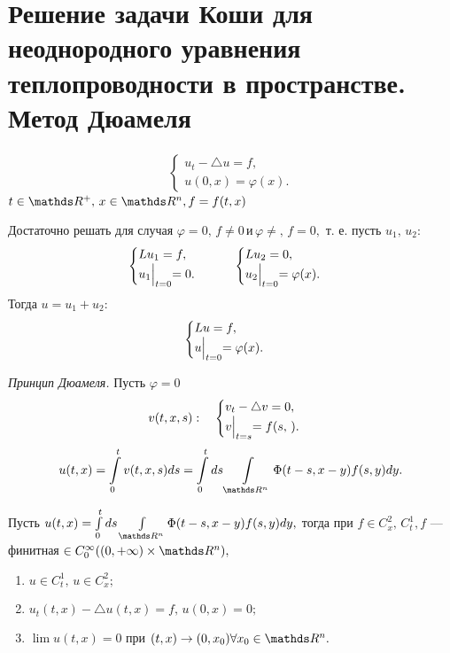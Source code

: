 \section{Решение задачи Коши для неоднородного уравнения теплопроводности в пространстве. Метод Дюамеля}
\begin{align}
    \begin{cases} 
        u_t - \bigtriangleup u = f, \\
        u (0, x) = \varphi (x).
    \end{cases}
\label{transcalencynonhom2}
\end{align}
$t \in \real^+,\, x \in \real^n, f=f(t,x)$

\begin{note}

Достаточно решать для случая $\varphi = 0, \, f \not= 0 \, \text{и} \, \varphi \not=, \, f = 0,$ т. е. пусть $u_1, \, u_2 :$
\begin{equation*}
\begin{cases} 
        Lu_1 = f, \\
        u_1\Bigl|_{t=0} = 0.
    \end{cases}
    \qquad
    \begin{cases} 
        Lu_2 = 0, \\
        u_2\Bigl|_{t=0} = \varphi (x).
    \end{cases}
\end{equation*}
Тогда $u = u_1+u_2:$
\begin{align}
\begin{cases} 
        Lu = f, \\
        u\Bigl|_{t=0} = \varphi (x).
    \end{cases}
    \end{align}
\end{note}

{\itshape Принцип Дюамеля.} Пусть $\varphi = 0$
\begin{equation*}
v(t,x,s) : \quad
    \begin{cases} 
        v_t - \bigtriangleup v = 0, \\
        v\Bigl|_{t=s} = f(s, \,).
    \end{cases}
\end{equation*}
$$u(t,x) = \int\limits_0^tv(t,x,s)ds = \int\limits_0^t ds \int\limits_{\real^n}\Phi(t-s, x-y)f(s,y)dy.$$

\begin{theorem}
Пусть $ u(t,x) = \int\limits_0^t ds \int\limits_{\real^n}\Phi(t-s, x-y)f(s,y)dy,$ тогда при $f\in C_x^2, \, C_t^1, f $ --- финитная $\in C_0^\infty( (0,+\infty) \times \real^n),$
\begin{enumerate}
\item $u \in C_t^1, \, u \in C_x^2;$
\item $u_t(t,x) - \bigtriangleup u(t,x) = f, \, u(0,x) = 0;$
\item $\lim u(t,x) = 0$ при $(t,x) \rightarrow (0,x_0) \forall x_0 \in \real^n.$
\end{enumerate}
\end{theorem}

